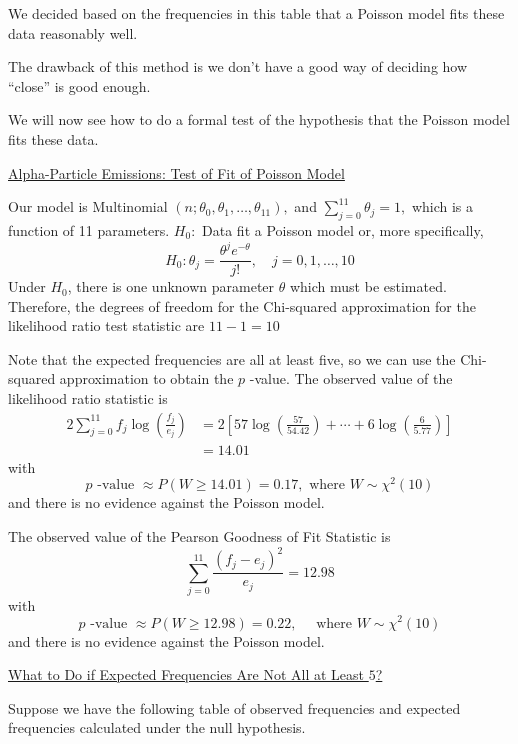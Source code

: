 We decided based on the frequencies in this table that a Poisson model fits these data
reasonably well.

The drawback of this method is we don't have a good way of deciding how ``close'' is good enough.

We will now see how to do a formal test of the hypothesis that the Poisson model fits these data.

\underline{Alpha-Particle Emissions: Test of Fit of Poisson Model}

Our model is Multinomial $\left(n ; \theta_{0}, \theta_{1}, \ldots, \theta_{11}\right),$ and $\sum_{j=0}^{11} \theta_{j}=1,$ which is a function of 11 parameters.
$H_{0}:$ Data fit a Poisson model or, more specifically,
\[
    H_{0}: \theta_{j}=\frac{\theta^{j} e^{-\theta}}{j !}, \quad j=0,1, \ldots, 10
\]
Under $H_{0}$, there is one unknown parameter $\theta$ which must be estimated.
Therefore, the degrees of freedom for the Chi-squared approximation for the likelihood ratio test statistic are $11-1=10$

Note that the expected frequencies are all at least five, so we can use the Chi-squared approximation to obtain the $p$ -value.
The observed value of the likelihood ratio statistic is
\[
    \begin{aligned}
        2 \sum_{j=0}^{11} f_{j} \log \left(\frac{f_{j}}{e_{j}}\right) & =2\left[57 \log \left(\frac{57}{54.42}\right)+\cdots+6 \log \left(\frac{6}{5.77}\right)\right] \\
                                                                      & =14.01
    \end{aligned}
\]
with
\[
    p \text { -value } \approx P(W \geq 14.01)=0.17, \text { where } W \sim \chi^{2}(10)
\]
and there is no evidence against the Poisson model.

The observed value of the Pearson Goodness of Fit Statistic is
\[
    \sum_{j=0}^{11} \frac{\left(f_{j}-e_{j}\right)^{2}}{e_{j}}=12.98
\]
with
\[
    p \text { -value } \approx P(W \geq 12.98)=0.22, \quad \text { where } W \sim \chi^{2}(10)
\]
and there is no evidence against the Poisson model.

\underline{What to Do if Expected Frequencies Are Not All at Least $ 5 $?}

Suppose we have the following table of observed frequencies and expected frequencies calculated
under the null hypothesis.

